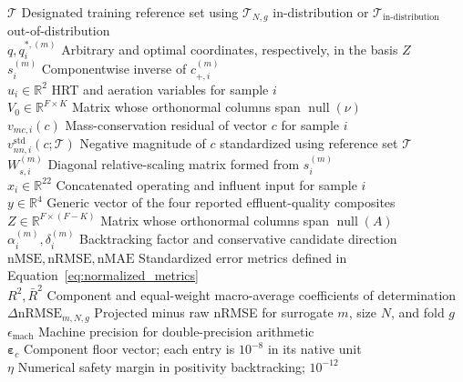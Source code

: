 \documentclass[a4paper,fleqn]{cas-sc}
\newcommand{\csvcomma}{,}
\begin{document}
\begin{tabbing}
$\mathcal{T}$ \> Designated training reference set using $\mathcal{T}_{N\csvcomma{}g}$ in-distribution or $\mathcal{T}_{\mathrm{in\text{-}distribution}}$ out-of-distribution \\
$q\csvcomma{}q_i^{*\csvcomma{}(m)}$ \> Arbitrary and optimal coordinates\csvcomma{} respectively\csvcomma{} in the basis $Z$ \\
$s_i^{(m)}$ \> Componentwise inverse of $c_{+\csvcomma{}i}^{(m)}$ \\
$u_i\in\mathbb{R}^{2}$ \> HRT and aeration variables for sample $i$ \\
$V_0\in\mathbb{R}^{F\times K}$ \> Matrix whose orthonormal columns span $\operatorname{null}(\nu)$ \\
$v_{mc\csvcomma{}i}(c)$ \> Mass-conservation residual of vector $c$ for sample $i$ \\
$v_{nn\csvcomma{}i}^{\mathrm{std}}(c;\mathcal{T})$ \> Negative magnitude of $c$ standardized using reference set $\mathcal{T}$ \\
$W_{s\csvcomma{}i}^{(m)}$ \> Diagonal relative-scaling matrix formed from $s_i^{(m)}$ \\
$x_i\in\mathbb{R}^{22}$ \> Concatenated operating and influent input for sample $i$ \\
$y\in\mathbb{R}^{4}$ \> Generic vector of the four reported effluent-quality composites \\
$Z\in\mathbb{R}^{F\times(F-K)}$ \> Matrix whose orthonormal columns span $\operatorname{null}(A)$ \\
$\alpha_i^{(m)}\csvcomma{}\delta_i^{(m)}$ \> Backtracking factor and conservative candidate direction \\
$\mathrm{nMSE}\csvcomma{}\mathrm{nRMSE}\csvcomma{}\mathrm{nMAE}$ \> Standardized error metrics defined in Equation~\eqref{eq:normalized_metrics} \\
$R^2\csvcomma{}\bar R^2$ \> Component and equal-weight macro-average coefficients of determination \\
$\Delta\mathrm{nRMSE}_{m\csvcomma{}N\csvcomma{}g}$ \> Projected minus raw nRMSE for surrogate $m$\csvcomma{} size $N$\csvcomma{} and fold $g$ \\
$\epsilon_{\mathrm{mach}}$ \> Machine precision for double-precision arithmetic \\
$\boldsymbol{\varepsilon}_c$ \> Component floor vector; each entry is $10^{-8}$ in its native unit \\
$\eta$ \> Numerical safety margin in positivity backtracking; $10^{-12}$ \\

\end{tabbing}
\end{document}
